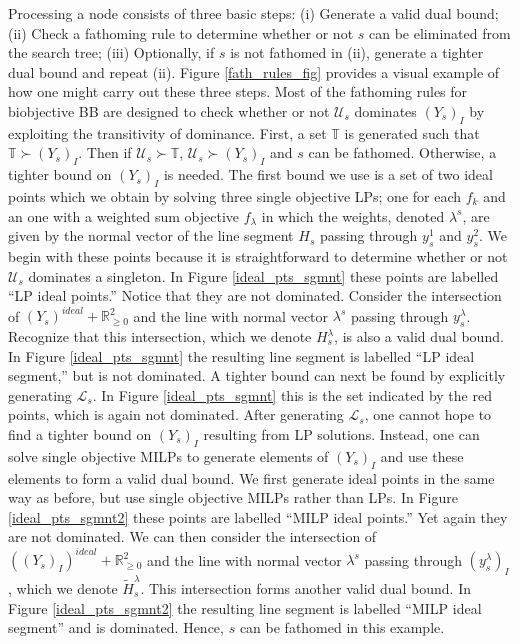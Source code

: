 \documentclass[11.5pt]{article}
\newcommand{\R}{\mathbb{R}}
\newcommand{\T}{\mathbb{T}}
\newcommand{\dom}{\succ}
\newcommand{\U}{\mathcal{U}}
\renewcommand{\L}{\mathcal{L}}
\newcommand{\nonneg}{\R^{2}_{\ge 0}}
\begin{document}
Processing a node consists of three basic steps: (i) Generate a valid dual bound; (ii) Check a fathoming rule to determine whether or not $s$ can be eliminated from the search tree; (iii) Optionally, if $s$ is not fathomed in (ii), generate a tighter dual bound and repeat (ii). Figure \ref{fath_rules_fig} provides a visual example of how one might carry out these three steps. Most of the fathoming rules for biobjective BB are designed to check whether or not $\U_s$ dominates $(Y_s)_I$ by exploiting the transitivity of dominance. First, a set $\T$ is generated such that $\T \dom (Y_s)_I$. Then if $\U_s \dom \T$, $\U_s \dom (Y_s)_I$ and $s$ can be fathomed. Otherwise, a tighter bound on $(Y_s)_I$ is needed. The first bound we use is a set of two ideal points which we obtain by solving three single objective LPs; one for each $f_k$ and an one with a weighted sum objective $f_\lambda$ in which the weights, denoted $\lambda^s$, are given by the normal vector of the line segment $H_s$ passing through $y^1_s$ and $y^2_s$. We begin with these points because it is straightforward to determine whether or not $\U_s$ dominates a singleton. In Figure \ref{ideal_pts_sgmnt} these points are labelled ``LP ideal points.'' Notice that they are not dominated. Consider the intersection of $(Y_s)^{ideal} + \nonneg$ and the line with normal vector $\lambda^s$ passing through $y^\lambda_s$. Recognize that this intersection, which we denote $H_s^\lambda$, is also a valid dual bound. In Figure \ref{ideal_pts_sgmnt} the resulting line segment is labelled ``LP ideal segment,'' but is not dominated. A tighter bound can next be found by explicitly generating $\L_s$. In Figure \ref{ideal_pts_sgmnt} this is the set indicated by the red points, which is again not dominated. After generating $\L_s$, one cannot hope to find a tighter bound on $(Y_s)_I$ resulting from LP solutions. Instead, one can solve single objective MILPs to generate elements of $(Y_s)_I$ and use these elements to form a valid dual bound. We first generate ideal points in the same way as before, but use single objective MILPs rather than LPs. In Figure \ref{ideal_pts_sgmnt2} these points are labelled ``MILP ideal points.'' Yet again they are not dominated. We can then consider the intersection of $((Y_s)_I)^{ideal} + \nonneg$ and the line with normal vector $\lambda^s$ passing through $(y^\lambda_s)_I$, which we denote $\tilde{H}_s^\lambda$. This intersection forms another valid dual bound. In Figure \ref{ideal_pts_sgmnt2} the resulting line segment is labelled ``MILP ideal segment'' and is dominated. Hence, $s$ can be fathomed in this example.
\end{document}
